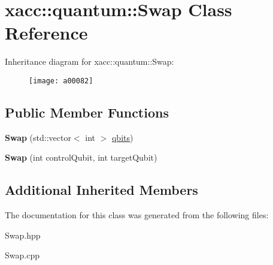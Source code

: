 \hypertarget{a00082}{}\section{xacc\+:\+:quantum\+:\+:Swap Class Reference}
\label{a00082}
Inheritance diagram for xacc\+:\+:quantum\+:\+:Swap\+:\begin{figure}[H]
\begin{center}
\leavevmode
\texttt{[image: a00082]}
\end{center}
\end{figure}
\subsection*{Public Member Functions}
\begin{DoxyCompactItemize}
\item 
{\bfseries Swap} (std\+::vector$<$ int $>$ \hyperlink{a00041_a2a56be6c2519ea65df4d06f4abae1393}{qbits})\hypertarget{a00082_a5c35a23a635f235a5615be65e769c121}{}\label{a00082_a5c35a23a635f235a5615be65e769c121}

\item 
{\bfseries Swap} (int control\+Qubit, int target\+Qubit)\hypertarget{a00082_ac19efe303b798e14441a2c235b5ba7f3}{}\label{a00082_ac19efe303b798e14441a2c235b5ba7f3}

\end{DoxyCompactItemize}
\subsection*{Additional Inherited Members}


The documentation for this class was generated from the following files\+:\begin{DoxyCompactItemize}
\item 
Swap.\+hpp\item 
Swap.\+cpp\end{DoxyCompactItemize}
